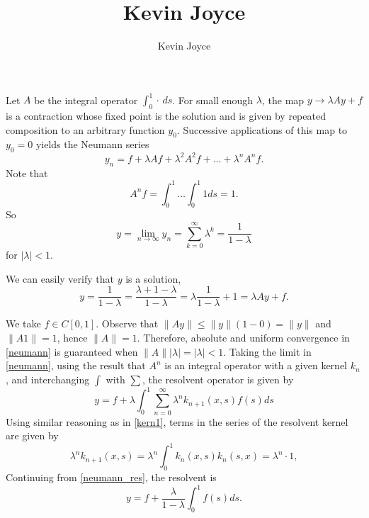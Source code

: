 \documentclass{homework}
\title{Kevin Joyce}
\author{Kevin Joyce}
\begin{document}
 
\newcommand{\figref}[1]{\figurename~\ref{#1}}
\renewcommand{\bar}{\overline}
\renewcommand{\hat}{\widehat}
\renewcommand{\SS}{\mathcal S}
\renewcommand{\NN}{\mathcal N}
\newcommand{\DD}{\mathcal D}
\newcommand{\eps}{\varepsilon}
\newcommand{\del}{\partial}


\begin{solution}
  Let $A$ be the integral operator $\int_0^1 \cdot\, ds$. For small enough $\lambda$, the map $y\to \lambda Ay + f$ is a contraction whose fixed point is the solution and is given by repeated composition to an arbitrary function $y_0$.  Successive applications of this map to $y_0 = 0$ yields the Neumann series
  \begin{equation}
    y_n = f + \lambda Af + \lambda^2 A^2 f + \dots + \lambda^n A^n f. \label{neumann}
  \end{equation}
  Note that
  \begin{equation}
    A^n f = \int_0^1 \dots \int_0^1 1 ds = 1. \label{kern1}
  \end{equation}
  So
  $$
    y = \lim_{n\to\infty} y_n = \sum_{k=0}^\infty \lambda^k = \frac{1}{1-\lambda}
  $$
  for $|\lambda| < 1$.

  We can easily verify that $y$ is a solution,
  $$
    y = \frac{1}{1-\lambda} = \frac{\lambda + 1 - \lambda}{1-\lambda} = \lambda \frac{1}{1-\lambda} + 1 = \lambda A y + f.
  $$
  \end{solution}



\begin{solution}
  We take $f \in C[0,1]$. Observe that $ \|Ay\| \le \|y\|(1-0) =
  \|y\|$ and $\|A 1\| = 1$, hence $\|A\| = 1$.  Therefore, absolute
  and uniform convergence in \eqref{neumann} is guaranteed when
  $\|A\||\lambda|=|\lambda|<1$. Taking the limit in
  \eqref{neumann}, using the result that $A^n$ is an integral operator with a given kernel $k_n$, and interchanging $\int$ with $\sum$, the
  resolvent operator is given by
  \begin{equation}
  y = f + \lambda \int_0^1 \sum_{n=0}^\infty \lambda^n k_{n+1}(x,s) f(s) ds \label{neumann_res}
  \end{equation}
  Using similar reasoning as in \eqref{kern1}, terms in the series of the resolvent kernel are given by 
$$
    \lambda^n k_{n+1}(x,s) = \lambda^n \int_0^1 k_n(x,s)k_n(s,x) = \lambda^n \cdot 1,
  $$
  Continuing from \eqref{neumann_res}, the resolvent is
  \begin{equation}
  y = f +  \frac{\lambda}{1-\lambda} \int_0^1 f(s) ds. \label{neumann_resolv}
  \end{equation}
\end{solution}
\end{document}
